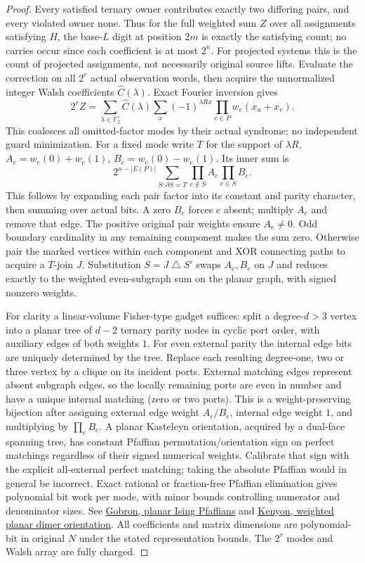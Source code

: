\documentclass[11pt]{article}
\begin{document}
\begin{proof}
Every satisfied ternary owner contributes exactly two differing pairs, and every violated owner none. Thus for the full weighted sum $Z$ over all assignments satisfying $H$, the base-$L$ digit at position $2m$ is exactly the satisfying count; no carries occur since each coefficient is at most $2^n$. For projected systems this is the count of projected assignments, not necessarily original source lifts. Evaluate the correction on all $2^r$ actual observation words, then acquire the unnormalized integer Walsh coefficients $\widehat C(\lambda)$. Exact Fourier inversion gives
\[
2^r Z=\sum_{\lambda\in\mathbb F_2^r}\widehat C(\lambda)
\sum_x(-1)^{\lambda Rx}\prod_{e\in P}w_e(x_u+x_v).
\]
This coalesces all omitted-factor modes by their actual syndrome; no independent guard minimization. For a fixed mode write $T$ for the support of $\lambda R$, $A_e=w_e(0)+w_e(1)$, $B_e=w_e(0)-w_e(1)$. Its inner sum is
\[
2^{n-|E(P)|}\sum_{S:\partial S=T}\prod_{e\notin S}A_e\prod_{e\in S}B_e.
\]
This follows by expanding each pair factor into its constant and parity character, then summing over actual bits. A zero $B_e$ forces $e$ absent; multiply $A_e$ and remove that edge. The positive original pair weights ensure $A_e\ne0$. Odd boundary cardinality in any remaining component makes the sum zero. Otherwise pair the marked vertices within each component and XOR connecting paths to acquire a $T$-join $J$. Substitution $S=J\mathbin{\triangle}S'$ swaps $A_e,B_e$ on $J$ and reduces exactly to the weighted even-subgraph sum on the planar graph, with signed nonzero weights.

For clarity a linear-volume Fisher-type gadget suffices: split a degree-$d>3$ vertex into a planar tree of $d-2$ ternary parity nodes in cyclic port order, with auxiliary edges of both weights $1$. For even external parity the internal edge bits are uniquely determined by the tree. Replace each resulting degree-one, two or three vertex by a clique on its incident ports. External matching edges represent absent subgraph edges, so the locally remaining ports are even in number and have a unique internal matching (zero or two ports). This is a weight-preserving bijection after assigning external edge weight $A_e/B_e$, internal edge weight $1$, and multiplying by $\prod_e B_e$. A planar Kasteleyn orientation, acquired by a dual-face spanning tree, has constant Pfaffian permutation/orientation sign on perfect matchings regardless of their signed numerical weights. Calibrate that sign with the explicit all-external perfect matching; taking the absolute Pfaffian would in general be incorrect. Exact rational or fraction-free Pfaffian elimination gives polynomial bit work per mode, with minor bounds controlling numerator and denominator sizes. See \href{https://arxiv.org/abs/1312.7289}{Gobron, planar Ising Pfaffians} and \href{https://www.numdam.org/item/10.5802/wbln.3.pdf}{Kenyon, weighted planar dimer orientation}. All coefficients and matrix dimensions are polynomial-bit in original $N$ under the stated representation bounds. The $2^r$ modes and Walsh array are fully charged.


\end{proof}
\end{document}
